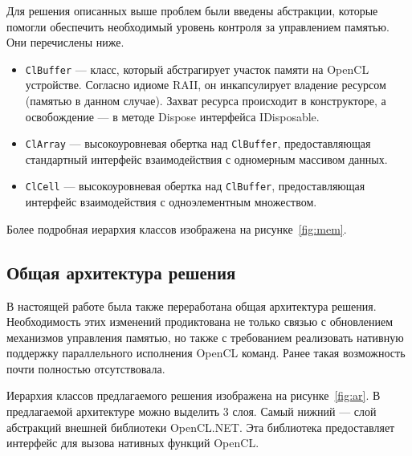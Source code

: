 Для решения описанных выше проблем были введены абстракции, которые помогли обеспечить необходимый уровень контроля за управлением памятью. Они перечислены ниже.
\begin{itemize}
    \item \verb|ClBuffer| --- класс, который абстрагирует участок памяти на OpenCL устройстве. Согласно идиоме RAII, он инкапсулирует владение ресурсом (памятью в данном случае). Захват ресурса происходит в конструкторе, а освобождение --- в методе Dispose интерфейса IDisposable. 
    \item \verb|ClArray| --- высокоуровневая обертка над \verb|ClBuffer|, предоставляющая стандартный интерфейс взаимодействия с одномерным массивом данных.
    \item \verb|ClCell| --- высокоуровневая обертка над \verb|ClBuffer|, предоставляющая интерфейс взаимодействия с одноэлементным множеством.
\end{itemize}

Более подробная иерархия классов изображена на рисунке~\ref{fig:mem}.


\subsection{Общая архитектура решения}
В настоящей работе была также переработана общая архитектура решения. Необходимость этих изменений продиктована не только связью с обновлением механизмов управления памятью, но также с требованием реализовать нативную поддержку параллельного исполнения OpenCL команд. Ранее такая возможность почти полностью отсутствовала.

Иерархия классов предлагаемого решения изображена на рисунке~\ref{fig:ar}.
В предлагаемой архитектуре можно выделить 3 слоя. Самый нижний --- слой абстракций внешней библиотеки OpenCL.NET. Эта библиотека предоставляет интерфейс для вызова нативных функций OpenCL. 

